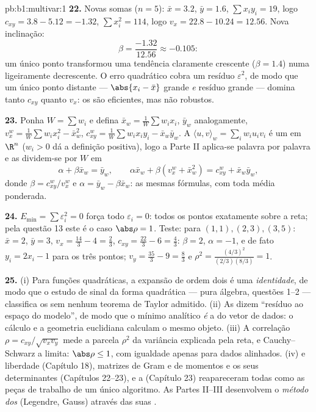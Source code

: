 \begin{solution}{pb:b1:multivar:1}
\textbf{22.} Novas somas ($n = 5$): $\bar x = 3.2$, $\bar y =
1.6$, $\sum x_iy_i = 19$, logo $c_{xy} = 3.8 - 5.12 = -1.32$,
$\sum x_i^2 = 114$, logo $v_x = 22.8 - 10.24 = 12.56$. Nova inclinação:
\[
\beta = \frac{-1.32}{12.56} \approx -0.105 :
\]
um único ponto transformou uma tendência claramente crescente ($\beta = 1.4$)
numa ligeiramente decrescente. O erro quadrático cobra um resíduo
$\varepsilon^2$, de modo que um único ponto distante --- $\abs{x_{i} - \bar x}$ grande \emph{e}
resíduo grande --- domina tanto $c_{xy}$ quanto $v_x$: os  são eficientes, mas não robustos.

\textbf{23.} Ponha $W = \sum w_i$ e defina $\bar x_w =
\frac1W\sum w_ix_i$, $\bar y_w$ analogamente, $v_x^w = \frac1W\sum
w_ix_i^2 - \bar x_w^2$,
$c^w_{xy} = \frac1W\sum w_ix_iy_i - \bar
x_w\bar y_w$. A  $\langle u, v\rangle_w = \sum_i w_iu_iv_i$ é um  em $\R^n$ ($w_i > 0$ dá
a definição positiva), logo a Parte II aplica-se palavra por palavra
e as  dividem-se por $W$ em
\[
\alpha + \beta\bar x_w = \bar y_w,
\qquad
\alpha\bar x_w + \beta(v^w_x + \bar x_w^2) = c^w_{xy} + \bar
x_w\bar y_w ,
\]
donde $\beta = c^w_{xy}/v^w_x$ e $\alpha = \bar y_w -
\beta\bar x_w$: as mesmas fórmulas, com toda média ponderada.

\textbf{24.} $E_{\min} = \sum\varepsilon_i^2 = 0$ força todo $\varepsilon_i = 0$: todos os pontos exatamente sobre
a reta; pela questão 13 este é o caso $\abs\rho = 1$. Teste: para $(1,1), (2,3),
(3,5)$:
$\bar x = 2$, $\bar y = 3$, $v_x = \frac{14}3 - 4 =
\frac23$, $c_{xy} = \frac{22}3 - 6 = \frac43$: $\beta = 2$, $\alpha = -1$, e de fato $y_i = 2x_i - 1$ para os
três pontos; $v_y = \frac{35}3 - 9 = \frac83$ e $\rho^2 =
\frac{(4/3)^2}{(2/3)(8/3)} = 1$.

\textbf{25.} (i) Para funções quadráticas, a expansão de ordem dois é
uma \emph{identidade}, de modo que o estudo de sinal da forma
quadrática --- pura álgebra, questões 1--2 --- classifica os  sem nenhum teorema de Taylor admitido. (ii) As  dizem ``resíduo  ao espaço do modelo'', de modo que
o mínimo analítico \emph{é} a  do vetor de dados: o
cálculo e a geometria euclidiana calculam o mesmo objeto. (iii) A
correlação $\rho = c_{xy}/\sqrt{v_xv_y}$ mede a parcela $\rho^2$ da variância explicada pela
reta, e Cauchy--Schwarz a limita: $\abs\rho \leq 1$, com igualdade apenas para
dados alinhados. (iv)  e liberdade (Capítulo 18), matrizes de
Gram e de momentos e os seus determinantes (Capítulos 22--23), e a
 (Capítulo 23) reapareceram todas como as peças de
trabalho de um único algoritmo. As Partes II--III desenvolvem o
\emph{método dos } (Legendre, Gauss) através das
suas \emph{}.
\end{solution}
